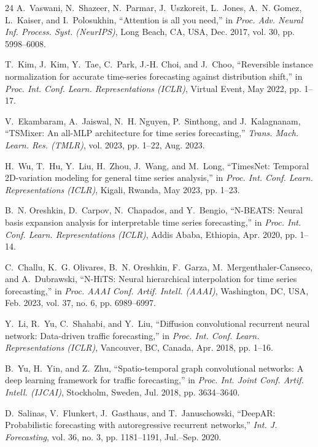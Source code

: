 \documentclass[journal]{IEEEtran}
\begin{document}
\begin{thebibliography}{24}
A.~Vaswani, N.~Shazeer, N.~Parmar, J.~Uszkoreit, L.~Jones, A.~N. Gomez, L.~Kaiser, and I.~Polosukhin, ``Attention is all you need,'' in \textit{Proc. Adv. Neural Inf. Process. Syst. (NeurIPS)}, Long Beach, CA, USA, Dec. 2017, vol. 30, pp. 5998--6008.

T.~Kim, J.~Kim, Y.~Tae, C.~Park, J.-H. Choi, and J.~Choo, ``Reversible instance normalization for accurate time-series forecasting against distribution shift,'' in \textit{Proc. Int. Conf. Learn. Representations (ICLR)}, Virtual Event, May 2022, pp. 1--17.

V.~Ekambaram, A.~Jaiswal, N.~H. Nguyen, P.~Sinthong, and J.~Kalagnanam, ``TSMixer: An all-MLP architecture for time series forecasting,'' \textit{Trans. Mach. Learn. Res. (TMLR)}, vol. 2023, pp. 1--22, Aug. 2023.

H.~Wu, T.~Hu, Y.~Liu, H.~Zhou, J.~Wang, and M.~Long, ``TimesNet: Temporal 2D-variation modeling for general time series analysis,'' in \textit{Proc. Int. Conf. Learn. Representations (ICLR)}, Kigali, Rwanda, May 2023, pp. 1--23.

B.~N. Oreshkin, D.~Carpov, N.~Chapados, and Y.~Bengio, ``N-BEATS: Neural basis expansion analysis for interpretable time series forecasting,'' in \textit{Proc. Int. Conf. Learn. Representations (ICLR)}, Addis Ababa, Ethiopia, Apr. 2020, pp. 1--14.

C.~Challu, K.~G. Olivares, B.~N. Oreshkin, F.~Garza, M.~Mergenthaler-Canseco, and A.~Dubrawski, ``N-HiTS: Neural hierarchical interpolation for time series forecasting,'' in \textit{Proc. AAAI Conf. Artif. Intell. (AAAI)}, Washington, DC, USA, Feb. 2023, vol. 37, no. 6, pp. 6989--6997.

Y.~Li, R.~Yu, C.~Shahabi, and Y.~Liu, ``Diffusion convolutional recurrent neural network: Data-driven traffic forecasting,'' in \textit{Proc. Int. Conf. Learn. Representations (ICLR)}, Vancouver, BC, Canada, Apr. 2018, pp. 1--16.

B.~Yu, H.~Yin, and Z.~Zhu, ``Spatio-temporal graph convolutional networks: A deep learning framework for traffic forecasting,'' in \textit{Proc. Int. Joint Conf. Artif. Intell. (IJCAI)}, Stockholm, Sweden, Jul. 2018, pp. 3634--3640.

D.~Salinas, V.~Flunkert, J.~Gasthaus, and T.~Januschowski, ``DeepAR: Probabilistic forecasting with autoregressive recurrent networks,'' \textit{Int. J. Forecasting}, vol. 36, no. 3, pp. 1181--1191, Jul.--Sep. 2020.


\end{thebibliography}
\end{document}
